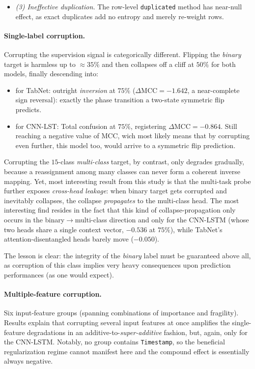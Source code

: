 \documentclass[a4paper, 9pt]{extarticle}
\begin{document}
\begin{itemize}
    \item \emph{(3) Ineffective duplication.} The row-level \texttt{duplicated} method has near-null effect, as exact duplicates add no entropy and merely re-weight rows.
\end{itemize}


  

\paragraph{Single-label corruption.}
Corrupting the supervision signal is categorically different. Flipping the \emph{binary} target is harmless up to $\approx 35\%$ and then collapses off a cliff at $50\%$ for both models, finally descending into:
\begin{itemize}
    \item for TabNet: outright \emph{inversion} at $75\%$ ($\Delta\mathrm{MCC}=-1.642$, a near-complete sign reversal): exactly the phase transition a two-state symmetric flip predicts.
    \item  for CNN-LST: Total confusion at $75\%$, registering $\Delta\mathrm{MCC}=-0.864$. Still reaching a negative value of MCC, wich most likely means that by corrupting even further, this model too, would arrive to a symmetric flip prediction.
\end{itemize}

Corrupting the $15$-class \emph{multi-class} target, by contrast, only degrades gradually, because a reassignment among many classes can never form a coherent inverse mapping. Yet, most interesting result from this study is that the multi-task probe further exposes \emph{cross-head leakage}: when binary target gets corrupted and inevitably collapses, the collapse \emph{propagates} to the multi-class head. The most interesting find resides in the fact that this kind of collapse-propagation only occurs in the binary$\rightarrow$multi-class direction and only for the CNN-LSTM (whose two heads share a single context vector, $-0.536$ at $75\%$), while TabNet's attention-disentangled heads barely move ($-0.050$). 

The lesson is clear: the integrity of the \emph{binary} label must be guaranteed above all, as corruption of this class implies very heavy consequences upon prediction performances (as one would expect).


\paragraph{Multiple-feature corruption.}
Six input-feature groups (spanning combinations of importance and fragility). Results explain that corrupting several input features at once amplifies the single-feature degradations in an additive-to-\emph{super-additive} fashion, but, again, only for the CNN-LSTM. Notably, no group contains \texttt{Timestamp}, so the beneficial regularization regime cannot manifest here and the compound effect is essentially always negative.
\end{document}
